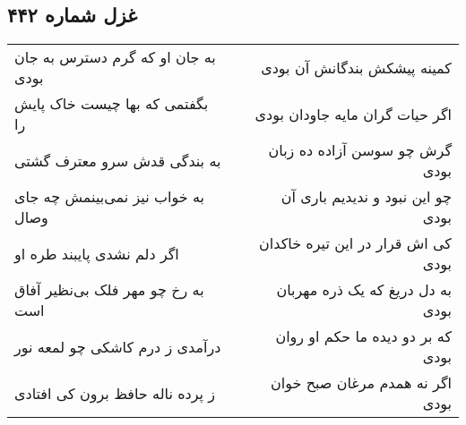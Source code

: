 \begin{center}
\section*{غزل شماره ۴۴۲}
\label{sec:sh442}
\begin{longtable}{l p{0.5cm} r}
به جان او که گرم دسترس به جان بودی
&&
کمینه پیشکش بندگانش آن بودی
\\
بگفتمی که بها چیست خاک پایش را
&&
اگر حیات گران مایه جاودان بودی
\\
به بندگی قدش سرو معترف گشتی
&&
گرش چو سوسن آزاده ده زبان بودی
\\
به خواب نیز نمی‌بینمش چه جای وصال
&&
چو این نبود و ندیدیم باری آن بودی
\\
اگر دلم نشدی پایبند طره او
&&
کی اش قرار در این تیره خاکدان بودی
\\
به رخ چو مهر فلک بی‌نظیر آفاق است
&&
به دل دریغ که یک ذره مهربان بودی
\\
درآمدی ز درم کاشکی چو لمعه نور
&&
که بر دو دیده ما حکم او روان بودی
\\
ز پرده ناله حافظ برون کی افتادی
&&
اگر نه همدم مرغان صبح خوان بودی
\\
\end{longtable}
\end{center}
